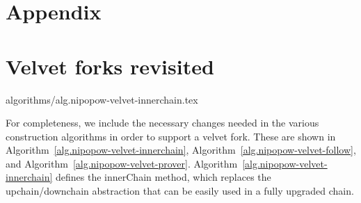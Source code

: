 \appendix
\section*{Appendix}

%
%
%
%
%
%


\section{Velvet forks revisited}

{algorithms/alg.nipopow-velvet-innerchain.tex}

For completeness, we include the necessary changes needed in the various
construction algorithms in order to support a velvet fork. These are shown in
Algorithm~\ref{alg.nipopow-velvet-innerchain},
Algorithm~\ref{alg.nipopow-velvet-follow}, and
Algorithm~\ref{alg.nipopow-velvet-prover}.
Algorithm~\ref{alg.nipopow-velvet-innerchain} defines the innerChain method,
which replaces the upchain/downchain abstraction that can be easily used in a
fully upgraded chain.

